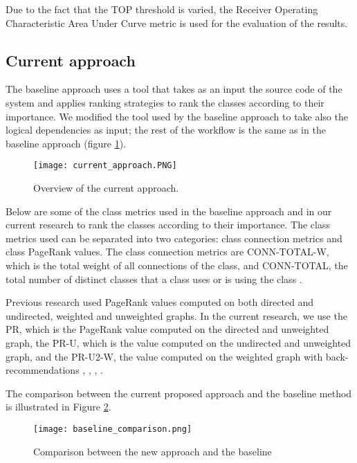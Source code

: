 Due to the fact that the TOP threshold is varied, the Receiver Operating Characteristic Area Under Curve metric is used for the evaluation of the results.



\subsection{Current approach}
\label{subsec:key_current_approach}

\hspace{4em}The baseline approach uses a tool that takes as an input the source code of the system and applies ranking strategies to rank the classes according to their importance. We modified the tool used by the baseline approach to take also the logical dependencies as input; the rest of the workflow is the same as in the baseline approach (figure \ref{fig:baseline_approach}).
\begin{figure}[H]
\centering
\texttt{[image: current\_approach.PNG]}
\caption{Overview of the current approach.}
\label{fig:baseline_approach}
\end{figure}

Below are some of the class metrics used in the baseline approach and in our current research to rank the classes according to their importance. The class metrics used can be separated into two categories: class connection metrics and class PageRank values. The class connection metrics are CONN-TOTAL-W, which is the total weight of all connections of the class, and CONN-TOTAL, the total number of distinct classes that a class uses or is using the class \cite{Finding-key-classes}.

Previous research used PageRank values computed on both directed and undirected, weighted and unweighted graphs. In the current research, we use the PR, which is the PageRank value computed on the directed and unweighted graph, the PR-U, which is the value computed on the undirected and unweighted graph, and the PR-U2-W, the value computed on the weighted graph with back-recommendations \cite{PagerankENASE}, \cite{enase15}, \cite{Finding-key-classes}, \cite{PagerankSACI}.

The comparison between the current proposed approach and the baseline method is illustrated in Figure \ref{fig:baseline_comparison}. 
\begin{figure}[H]
\centering
\texttt{[image: baseline\_comparison.png]}
\caption{ Comparison between the new approach and the baseline }
\label{fig:baseline_comparison}
\centering
\end{figure}


